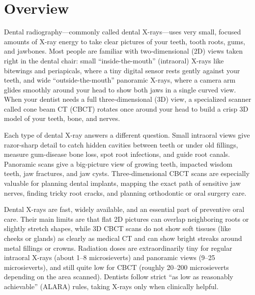\label{ch:infographic-dental-radiography}

\section{Overview}

Dental radiography---commonly called dental X-rays---uses very small, focused amounts of X-ray energy to take clear pictures of your teeth, tooth roots, gums, and jawbones. Most people are familiar with two-dimensional (2D) views taken right in the dental chair: small ``inside-the-mouth'' (intraoral) X-rays like bitewings and periapicals, where a tiny digital sensor rests gently against your teeth, and wide ``outside-the-mouth'' panoramic X-rays, where a camera arm glides smoothly around your head to show both jaws in a single curved view. When your dentist needs a full three-dimensional (3D) view, a specialized scanner called cone beam CT (CBCT) rotates once around your head to build a crisp 3D model of your teeth, bone, and nerves.

Each type of dental X-ray answers a different question. Small intraoral views give razor-sharp detail to catch hidden cavities between teeth or under old fillings, measure gum-disease bone loss, spot root infections, and guide root canals. Panoramic scans give a big-picture view of growing teeth, impacted wisdom teeth, jaw fractures, and jaw cysts. Three-dimensional CBCT scans are especially valuable for planning dental implants, mapping the exact path of sensitive jaw nerves, finding tricky root cracks, and planning orthodontic or oral surgery care.

Dental X-rays are fast, widely available, and an essential part of preventive oral care. Their main limits are that flat 2D pictures can overlap neighboring roots or slightly stretch shapes, while 3D CBCT scans do not show soft tissues (like cheeks or glands) as clearly as medical CT and can show bright streaks around metal fillings or crowns. Radiation doses are extraordinarily tiny for regular intraoral X-rays (about 1--8 microsieverts) and panoramic views (9--25 microsieverts), and still quite low for CBCT (roughly 20--200 microsieverts depending on the area scanned). Dentists follow strict ``as low as reasonably achievable'' (ALARA) rules, taking X-rays only when clinically helpful.

